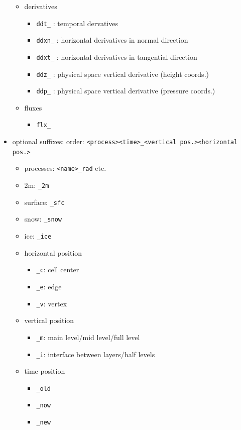\documentclass[a4paper,11pt,DIV16,BCOR1cm,titlepage]{scrartcl}
\begin{document}
\begin{itemize}
\begin{itemize}
\item derivatives
\begin{itemize}
\item \texttt{ddt\_} : temporal dervatives
\item \texttt{ddxn\_} : horizontal derivatives in normal direction
\item \texttt{ddxt\_} : horizontal derivatives in tangential direction
\item \texttt{ddz\_} : physical space vertical derivative (height coords.)
\item \texttt{ddp\_} : physical space vertical derivative (pressure coords.)
\end{itemize}

\item fluxes
\begin{itemize}
\item \texttt{flx\_}
\end{itemize}
\end{itemize}

\item optional suffixes: order: \texttt{<process><time>\_<vertical pos.><horizontal pos.>}
\begin{itemize}
\item processes: \texttt{<name>\_rad} etc.
\item 2m: \texttt{\_2m}
\item surface: \texttt{\_sfc}
\item snow: \texttt{\_snow}
\item ice: \texttt{\_ice}
\item horizontal position
\begin{itemize}
\item \texttt{\_c}: cell center
\item \texttt{\_e}: edge
\item \texttt{\_v}: vertex
\end{itemize}

\item vertical position
\begin{itemize}
\item \texttt{\_m}: main level/mid level/full level
\item \texttt{\_i}: interface between layers/half levels
\end{itemize}

\item time position
\begin{itemize}
\item \texttt{\_old}
\item \texttt{\_now}
\item \texttt{\_new}
\end{itemize}


\end{itemize}
\end{itemize}
\end{document}

